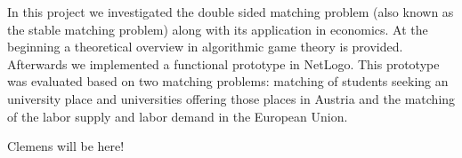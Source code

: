 In this project we investigated the double sided matching problem (also known as the stable matching problem) along with its application in economics. At the beginning a theoretical overview in algorithmic game theory is provided. Afterwards we implemented a functional prototype in NetLogo\cite{netlogo}. This prototype was evaluated based on two matching problems: matching of students seeking an university place and universities offering those places in Austria and the matching of the labor supply and labor demand in the European Union.

Clemens will be here!
